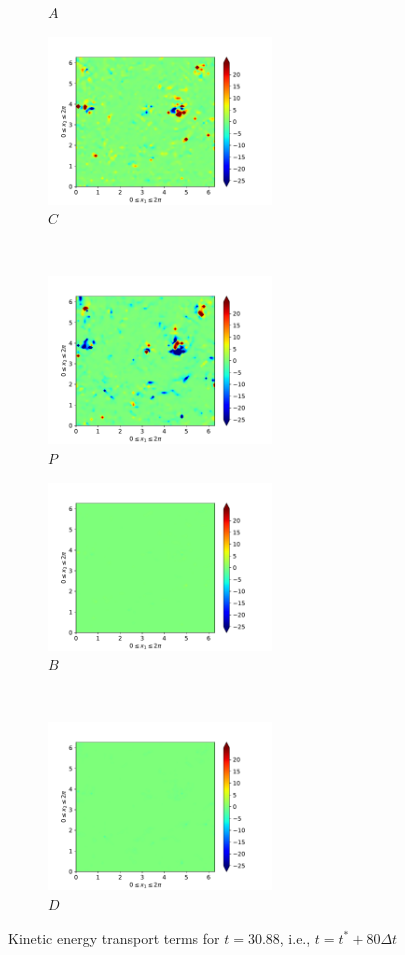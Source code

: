 \begin{figure}[H]
\begin{subfigure}{0.45\textwidth}
        \caption{$A$}
    \end{subfigure}
    \newline
    \begin{subfigure}{0.45\textwidth}
        \includegraphics[height=1.75in]{media/run-cds-65/C-ke-1420}
        \caption{$C$}
    \end{subfigure}
    ~
    \begin{subfigure}{0.45\textwidth}
        \includegraphics[height=1.75in]{media/run-cds-65/P-ke-1420}
        \caption{$P$}
    \end{subfigure}
    \newline
    \begin{subfigure}{0.45\textwidth}
        \includegraphics[height=1.75in]{media/run-cds-65/B-ke-1420}
        \caption{$B$}
    \end{subfigure}
    ~
    \begin{subfigure}{0.45\textwidth}
        \includegraphics[height=1.75in]{media/run-cds-65/D-ke-1420}
        \caption{$D$}
    \end{subfigure}
    \caption{Kinetic energy transport terms for $t=30.88$, i.e., $t=t^{\ast} + 80 \Delta t$}
\end{figure}
